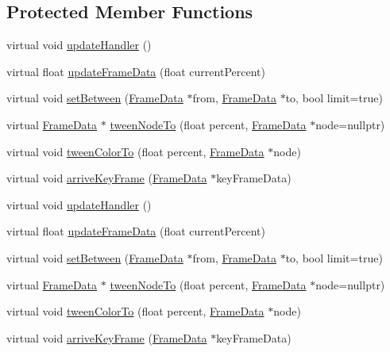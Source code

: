 \subsection*{Protected Member Functions}
\begin{DoxyCompactItemize}
\item 
virtual void \hyperlink{classcocostudio_1_1Tween_a35d383d868e393dc518c1197fc3a00ff}{update\+Handler} ()
\item 
virtual float \hyperlink{classcocostudio_1_1Tween_ad9af80853f52ed2470848352a7be5793}{update\+Frame\+Data} (float current\+Percent)
\item 
virtual void \hyperlink{classcocostudio_1_1Tween_a4f0c75acccfa6496829514d0ea022035}{set\+Between} (\hyperlink{classcocostudio_1_1FrameData}{Frame\+Data} $\ast$from, \hyperlink{classcocostudio_1_1FrameData}{Frame\+Data} $\ast$to, bool limit=true)
\item 
virtual \hyperlink{classcocostudio_1_1FrameData}{Frame\+Data} $\ast$ \hyperlink{classcocostudio_1_1Tween_a0b84b5a8c09473f25ec6f3f61041b413}{tween\+Node\+To} (float percent, \hyperlink{classcocostudio_1_1FrameData}{Frame\+Data} $\ast$node=nullptr)
\item 
virtual void \hyperlink{classcocostudio_1_1Tween_ae8e912a19e1b4a79056977912dd7f4e4}{tween\+Color\+To} (float percent, \hyperlink{classcocostudio_1_1FrameData}{Frame\+Data} $\ast$node)
\item 
virtual void \hyperlink{classcocostudio_1_1Tween_a1bceeb45614a71f31af7359f61b38d5d}{arrive\+Key\+Frame} (\hyperlink{classcocostudio_1_1FrameData}{Frame\+Data} $\ast$key\+Frame\+Data)
\item 
virtual void \hyperlink{classcocostudio_1_1Tween_ac595b653e11b8548f9ce599c0bc79f08}{update\+Handler} ()
\item 
virtual float \hyperlink{classcocostudio_1_1Tween_aa609249406b24251ada17de2b645bc77}{update\+Frame\+Data} (float current\+Percent)
\item 
virtual void \hyperlink{classcocostudio_1_1Tween_a36a9be6a865b79194f4b3c567d2e7226}{set\+Between} (\hyperlink{classcocostudio_1_1FrameData}{Frame\+Data} $\ast$from, \hyperlink{classcocostudio_1_1FrameData}{Frame\+Data} $\ast$to, bool limit=true)
\item 
virtual \hyperlink{classcocostudio_1_1FrameData}{Frame\+Data} $\ast$ \hyperlink{classcocostudio_1_1Tween_aeb476654832ee48ef69cbb6643e6dd1a}{tween\+Node\+To} (float percent, \hyperlink{classcocostudio_1_1FrameData}{Frame\+Data} $\ast$node=nullptr)
\item 
virtual void \hyperlink{classcocostudio_1_1Tween_ae0616810461ee586d50caaa315c20a49}{tween\+Color\+To} (float percent, \hyperlink{classcocostudio_1_1FrameData}{Frame\+Data} $\ast$node)
\item 
virtual void \hyperlink{classcocostudio_1_1Tween_a71d3c53c1cd83747807916a13e9d9b4c}{arrive\+Key\+Frame} (\hyperlink{classcocostudio_1_1FrameData}{Frame\+Data} $\ast$key\+Frame\+Data)
\end{DoxyCompactItemize}
